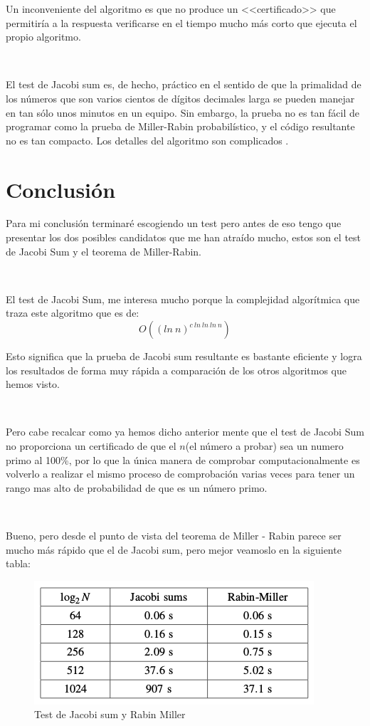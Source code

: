 \documentclass[11pt, conference]{IEEEtran}
\begin{document}
Un inconveniente del algoritmo es que no produce un <<certificado>> que permitiría a la respuesta verificarse en el tiempo mucho más corto que ejecuta el propio algoritmo.

\

El test de Jacobi sum es, de hecho, práctico en el sentido de que la primalidad de los números que son varios cientos de dígitos decimales larga se pueden manejar en tan sólo unos minutos en un equipo. Sin embargo, la prueba no es tan fácil de programar como la prueba de Miller-Rabin probabilístico, y el código resultante no es tan compacto. Los detalles del algoritmo son complicados .

\section{Conclusión}
Para mi conclusión terminaré escogiendo un test pero antes de eso tengo que presentar los dos posibles candidatos que me han atraído mucho, estos son el test de Jacobi Sum y el teorema de Miller-Rabin.

\

El test de Jacobi Sum, me interesa mucho porque  la complejidad algorítmica que traza este algoritmo que es de:
\[O((ln\ n)^{c\ ln\ ln\ ln\ n})\]

Esto significa que la prueba de Jacobi sum resultante es bastante eficiente y logra los resultados de forma muy rápida a comparación de los otros algoritmos que hemos visto.

\

Pero cabe recalcar como ya hemos dicho anterior mente que el test de Jacobi Sum no proporciona un certificado de que el $n$(el número a probar) sea un numero primo al 100\%, por lo que la única manera de comprobar computacionalmente es volverlo a realizar el mismo proceso de comprobación varias veces para tener un rango mas alto de probabilidad de que es un número primo.

\

Bueno, pero desde el punto de vista del teorema de Miller - Rabin parece ser mucho más rápido que el de Jacobi sum, pero mejor veamoslo en la siguiente tabla:

\begin{figure}[h]
	\begin{center}
		\includegraphics[scale=0.6]{7.png}
		\caption{Test de Jacobi sum y Rabin Miller} 
	\end{center}
\end{figure}
\end{document}
